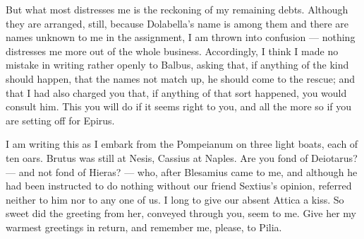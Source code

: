  But what most distresses me is the reckoning of my remaining debts. Although they are arranged, still, because Dolabella's name is among them and there are names unknown to me in the assignment, I am thrown into confusion --- nothing distresses me more out of the whole business. Accordingly, I think I made no mistake in writing rather openly to Balbus, asking that, if anything of the kind should happen, that the names not match up, he should come to the rescue; and that I had also charged you that, if anything of that sort happened, you would consult him. This you will do if it seems right to you, and all the more so if you are setting off for Epirus.

 I am writing this as I embark from the Pompeianum on three light boats, each of ten oars. Brutus was still at Nesis, Cassius at Naples. Are you fond of Deiotarus? --- and not fond of Hieras? --- who, after Blesamius came to me, and although he had been instructed to do nothing without our friend Sextius's opinion, referred neither to him nor to any one of us. I long to give our absent Attica a kiss. So sweet did the greeting from her, conveyed through you, seem to me. Give her my warmest greetings in return, and remember me, please, to Pilia.
